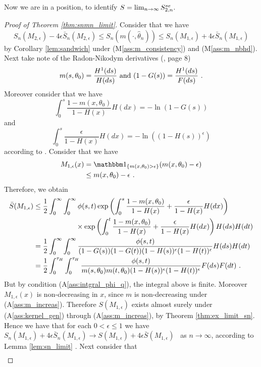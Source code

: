Now we are in a position, to identify $S = \lim_{n\to\infty} S_{2,n}^{se}$. 
\begin{proof}[Proof of Theorem \ref{thm:snmn_limit}]
	Consider that we have
	$$S_n(M_{2,\epsilon}) - 4\epsilon \bar{S}_n(M_{2,\epsilon}) \leq S_n(m(\cdot, \hat\theta_n)) \leq S_n(M_{1,\epsilon}) + 4\epsilon \bar{S}_n(M_{1,\epsilon})$$
	by Corollary \ref{lem:sandwich} under (M\ref{ass:m_consistency}) and (M\ref{ass:m_nbhd}). Next take note of the Radon-Nikodym derivatives (\cf \cite{dikta2000strong}, page 8)
	$$m(s,\theta_0) = \frac{H^1(ds)}{H(ds)} \textrm{ and } (1-G(s)) = \frac{H^1(ds)}{F(ds)}\textrm{ .}$$
	Moreover consider that we have
	$$\int_{0}^{s} \frac{1-m(x,\theta_0)}{1-H(x)} H(dx) = -\ln(1-G(s))$$
	and 
	$$\int_{0}^{s} \frac{\epsilon}{1-H(x)} H(dx)= -\ln((1-H(s))^\epsilon)$$
	according to \cite{dikta2000strong}.
	Consider that we have 
	\begin{align*}
		M_{1,\epsilon}(x) &= \I{ m(x,\theta_0)>\epsilon}(m(x,\theta_0)-\epsilon)\\
		&\leq m(x,\theta_0)-\epsilon \mdot
	\end{align*}
	Therefore, we obtain
	\begin{align*}
		\bar{S}(M_{1,\epsilon}) &\leq \frac{1}{2}\int_{0}^{\infty} \int_{0}^{\infty} \phi(s,t)  \exp\left(\int_{0}^{s} \frac{1-m(x,\theta_0)}{1-H(x)} + \frac{\epsilon}{1-H(x)} H(dx)\right)\\
		&\qquad\qquad\qquad \times \exp\left(\int_{0}^{t} \frac{1-m(x,\theta_0)}{1-H(x)} + \frac{\epsilon}{1-H(x)} H(dx) \right)H(ds)H(dt)\\
		&= \frac{1}{2}\int_{0}^{\infty} \int_{0}^{\infty} \frac{\phi(s,t)}{(1-G(s))(1-G(t))(1-H(s))^\epsilon(1-H(t))^\epsilon} H(ds)H(dt)\\
		&= \frac{1}{2}\int_{0}^{\tau_H} \int_{0}^{\tau_H} \frac{\phi(s,t)}{m(s,\theta_0)m(t,\theta_0)(1-H(s))^\epsilon(1-H(t))^\epsilon} F(ds)F(dt)\textrm{ .}
	\end{align*}
	But by condition (A\ref{ass:intgral_phi_q}), the integral above is finite. Moreover $M_{1,\epsilon}(x)$ is non-decreasing in $x$, since $m$ is non-decreasing under (A\ref{ass:m_increas}). Therefore $S(M_{1,\epsilon})$ exists almost surely under (A\ref{ass:kernel_gen}) through (A\ref{ass:m_increas}), by Theorem \ref{thm:ex_limit_sn}. Hence we have that for each $0<\epsilon\leq1$ we have $S_n(M_{1,\epsilon}) + 4\epsilon \bar{S}_n(M_{1,\epsilon}) \to S(M_{1,\epsilon}) + 4\epsilon \bar{S}(M_{1,\epsilon})$ \wpo\ as $n\to\infty$, according to Lemma \ref{lem:sn_limit} . 
	Next consider that 
	\begin{align*}

\end{align*}
\end{proof}
